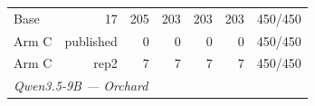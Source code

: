 \begin{table}[t]
{\begin{tabular}{lrrrrrr}
Base & 17 & 205 & 203 & 203 & 203 & 450/450 \\
Arm C & published & 0 & 0 & 0 & 0 & 450/450 \\
Arm C & rep2 & 7 & 7 & 7 & 7 & 450/450 \\
\midrule
\multicolumn{7}{l}{\textit{Qwen3.5-9B --- Orchard}} \\

\end{tabular}}
\end{table}
